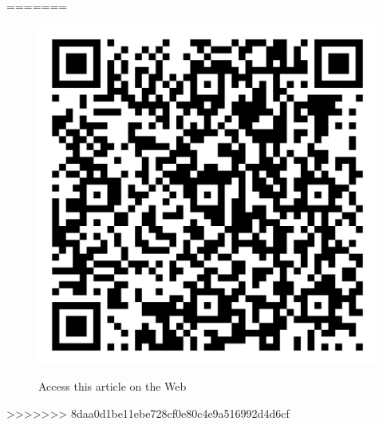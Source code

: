 =======
\begin{figure}[H]
\centering
\includegraphics[scale=.15]{src/Figures/QR-codes/qr-code_experiential-learning.png}

\medskip

{\large\sf Access this article on the Web}
\end{figure}
>>>>>>> 8daa0d1be11ebe728cf0e80c4e9a516992d4d6cf
